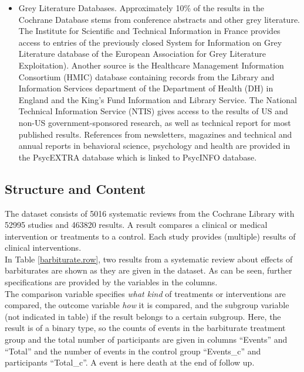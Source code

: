 \begin{itemize}
\item Grey Literature Databases. Approximately 10\% of the results in the Cochrane Database stems from conference abstracts and other grey literature. The Institute for Scientific and Technical Information in France provides access to entries of the previously closed System for Information on Grey Literature database of the European Association for Grey Literature Exploitation). Another source is the Healthcare Management Information Consortium (HMIC) database containing records from the Library and Information Services department of the Department of Health (DH) in England and the King's Fund Information and Library Service. The National Technical Information Service (NTIS) gives access to the results of US and non-US government-sponsored research, as well as technical report for most published results. References from newsletters, magazines and technical and annual reports in behavioral science, psychology and health are provided in the PsycEXTRA database which is linked to PsycINFO database.
\end{itemize}


\subsection{Structure and Content}
The dataset consists of 5016 systematic reviews from the Cochrane Library with 52995 studies and 463820 results. A result compares a clinical or medical intervention or treatments to a control. Each study provides (multiple) results of clinical interventions. \\
In Table \ref{barbiturate.row}, two results from a systematic review about effects of barbiturates are shown as they are given in the dataset. As can be seen, further specifications are provided by the variables in the columns. \\
The comparison variable specifies \textit{what kind} of treatments or interventions are compared, the outcome variable \textit{how} it is compared, and the subgroup variable (not indicated in table) if the result belongs to a certain subgroup. Here, the result is of a binary type, so the counts of events in the barbiturate treatment group and the total number of participants are given in columns ``Events'' and ``Total'' and the number of events in the control group ``Events\_c'' and participants ``Total\_c''. A event is here death at the end of follow up.

